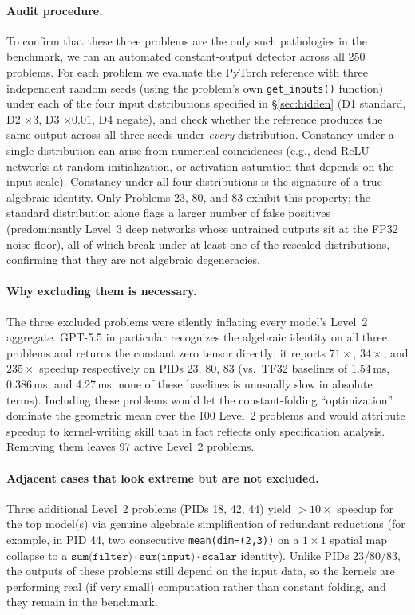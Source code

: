 \documentclass[]{fairmeta}
\begin{document}
\paragraph{Audit procedure.} To confirm that these three problems are the only such pathologies in the benchmark, we ran an automated constant-output detector across all 250 problems. For each problem we evaluate the PyTorch reference with three independent random seeds (using the problem's own \texttt{get\_inputs()} function) under each of the four input distributions specified in \S\ref{sec:hidden} (D1 standard, D2 $\times 3$, D3 $\times 0.01$, D4 negate), and check whether the reference produces the same output across all three seeds under \emph{every} distribution. Constancy under a single distribution can arise from numerical coincidences (e.g., dead-ReLU networks at random initialization, or activation saturation that depends on the input scale). Constancy under all four distributions is the signature of a true algebraic identity. Only Problems 23, 80, and 83 exhibit this property; the standard distribution alone flags a larger number of false positives (predominantly Level~3 deep networks whose untrained outputs sit at the FP32 noise floor), all of which break under at least one of the rescaled distributions, confirming that they are not algebraic degeneracies.

\paragraph{Why excluding them is necessary.} The three excluded problems were silently inflating every model's Level~2 aggregate. GPT-5.5 in particular recognizes the algebraic identity on all three problems and returns the constant zero tensor directly: it reports $71\times$, $34\times$, and $235\times$ speedup respectively on PIDs 23, 80, 83 (vs.\ TF32 baselines of 1.54\,ms, 0.386\,ms, and 4.27\,ms; none of these baselines is unusually slow in absolute terms). Including these problems would let the constant-folding ``optimization'' dominate the geometric mean over the 100 Level~2 problems and would attribute speedup to kernel-writing skill that in fact reflects only specification analysis. Removing them leaves 97 active Level~2 problems.

\paragraph{Adjacent cases that look extreme but are not excluded.} Three additional Level~2 problems (PIDs 18, 42, 44) yield $>10\times$ speedup for the top model(s) via genuine algebraic simplification of redundant reductions (for example, in PID 44, two consecutive \texttt{mean(dim=(2,3))} on a $1{\times}1$ spatial map collapse to a $\texttt{sum(filter)}\cdot\texttt{sum(input)}\cdot\texttt{scalar}$ identity). Unlike PIDs 23/80/83, the outputs of these problems still depend on the input data, so the kernels are performing real (if very small) computation rather than constant folding, and they remain in the benchmark.
\end{document}
